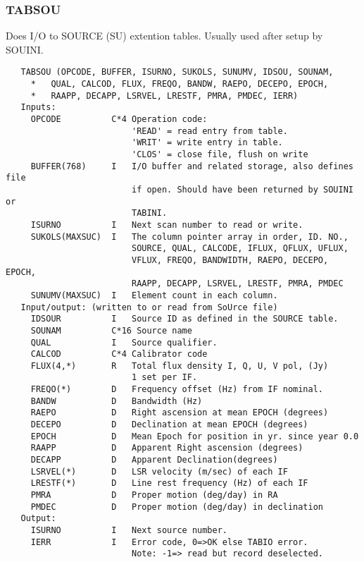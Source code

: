 \subsubsection{TABSOU}
Does I/O to SOURCE (SU) extention tables. Usually used after setup by
SOUINI.
\begin{verbatim}
   TABSOU (OPCODE, BUFFER, ISURNO, SUKOLS, SUNUMV, IDSOU, SOUNAM,
     *   QUAL, CALCOD, FLUX, FREQO, BANDW, RAEPO, DECEPO, EPOCH,
     *   RAAPP, DECAPP, LSRVEL, LRESTF, PMRA, PMDEC, IERR)
   Inputs:
     OPCODE          C*4 Operation code:
                         'READ' = read entry from table.
                         'WRIT' = write entry in table.
                         'CLOS' = close file, flush on write
     BUFFER(768)     I   I/O buffer and related storage, also defines file
                         if open. Should have been returned by SOUINI or
                         TABINI.
     ISURNO          I   Next scan number to read or write.
     SUKOLS(MAXSUC)  I   The column pointer array in order, ID. NO.,
                         SOURCE, QUAL, CALCODE, IFLUX, QFLUX, UFLUX,
                         VFLUX, FREQO, BANDWIDTH, RAEPO, DECEPO, EPOCH,
                         RAAPP, DECAPP, LSRVEL, LRESTF, PMRA, PMDEC
     SUNUMV(MAXSUC)  I   Element count in each column.
   Input/output: (written to or read from SoUrce file)
     IDSOUR          I   Source ID as defined in the SOURCE table.
     SOUNAM          C*16 Source name
     QUAL            I   Source qualifier.
     CALCOD          C*4 Calibrator code
     FLUX(4,*)       R   Total flux density I, Q, U, V pol, (Jy)
                         1 set per IF.
     FREQO(*)        D   Frequency offset (Hz) from IF nominal.
     BANDW           D   Bandwidth (Hz)
     RAEPO           D   Right ascension at mean EPOCH (degrees)
     DECEPO          D   Declination at mean EPOCH (degrees)
     EPOCH           D   Mean Epoch for position in yr. since year 0.0
     RAAPP           D   Apparent Right ascension (degrees)
     DECAPP          D   Apparent Declination(degrees)
     LSRVEL(*)       D   LSR velocity (m/sec) of each IF
     LRESTF(*)       D   Line rest frequency (Hz) of each IF
     PMRA            D   Proper motion (deg/day) in RA
     PMDEC           D   Proper motion (deg/day) in declination
   Output:
     ISURNO          I   Next source number.
     IERR            I   Error code, 0=>OK else TABIO error.
                         Note: -1=> read but record deselected.
\end{verbatim}
